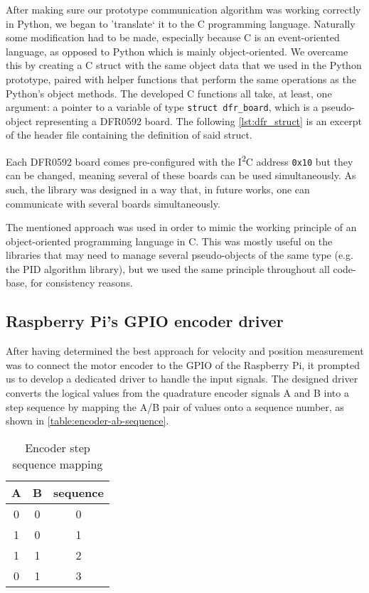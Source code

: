 After making sure our prototype communication algorithm was working correctly in Python, we began to 'translate` it to the C programming language.
Naturally some modification had to be made, especially because C is an event-oriented language, as opposed to Python which is mainly object-oriented.
We overcame this by creating a C struct with the same object data that we used in the Python prototype, paired with helper functions that perform the same operations as the Python's object methods.
The developed C functions all take, at least, one argument: a pointer to a variable of type \verb|struct dfr_board|, which is a pseudo-object representing a DFR0592 board.
The following \autoref{lst:dfr_struct} is an excerpt of the header file containing the definition of said struct.



Each DFR0592 board comes pre-configured with the I\textsuperscript{2}C address \verb|0x10| but they can be changed, meaning several of these boards can be used simultaneously.
As such, the library was designed in a way that, in future works, one can communicate with several boards simultaneously.

The mentioned approach was used in order to mimic the working principle of an object-oriented programming language in C.
This was mostly useful on the libraries that may need to manage several pseudo-objects of the same type (e.g. the PID algorithm library), but we used the same principle throughout all code-base, for consistency reasons.

\subsection{Raspberry Pi's GPIO encoder driver}
After having determined the best approach for velocity and position measurement was to connect the motor encoder to the GPIO of the Raspberry Pi, it prompted us to develop a dedicated driver to handle the input signals.
The designed driver converts the logical values from the quadrature encoder signals A and B into a step sequence by mapping the A/B pair of values onto a sequence number, as shown in \autoref{table:encoder-ab-sequence}.

\begin{table}[t]
	\centering
	\caption{Encoder step sequence mapping}
	\label{table:encoder-ab-sequence}
	\begin{tabular}{|c|c|c|}
		\hline
		A & B & sequence  \\
		\hline
		0 & 0 & 0         \\
		\hline
		1 & 0 & 1         \\
		\hline
		1 & 1 & 2         \\
		\hline
		0 & 1 & 3         \\
		\hline
	\end{tabular}
\end{table}

